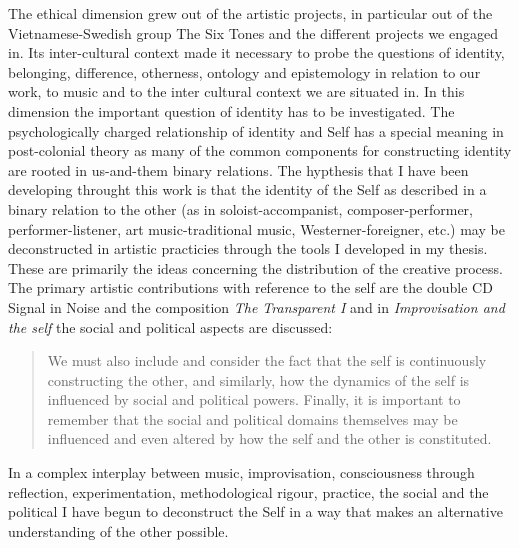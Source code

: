 \documentclass[a4paper]{article}
\begin{document}
The ethical dimension grew out of the artistic projects, in particular out of the Vietnamese-Swedish group The Six Tones and the different projects we engaged in. Its inter-cultural context made it necessary to probe the questions of identity, belonging, difference, otherness, ontology and epistemology in relation to our work, to music and to the inter cultural context we are situated in. In this dimension the important question of identity has to be investigated. The psychologically charged relationship of identity and Self has a special meaning in post-colonial theory as many of the common components for constructing identity are rooted in us-and-them binary relations. The hypthesis that I have been developing throught this work is that the identity of the Self as described in a binary relation to the other (as in soloist-accompanist, composer-performer, performer-listener, art music-traditional music, Westerner-foreigner, etc.) may be deconstructed in artistic practicies through the tools I developed in my thesis. These are primarily the ideas concerning the distribution of the creative process. The primary artistic contributions with reference to the self are the double CD Signal in Noise \cite{sixtones13} and the composition \emph{The Transparent I} \cite{frisk-transparent} and in \emph{Improvisation and the self} \cite{frisk12-improv} the social and political aspects are discussed:

\begin{quote}
  We must also include and consider the fact that the self is
  continuously constructing the other, and similarly, how the dynamics
  of the self is influenced by social and political powers. Finally,
  it is important to remember that the social and political domains
  themselves may be influenced and even altered by how the self and
  the other is constituted.
\end{quote}

In a complex interplay between music, improvisation, consciousness through reflection, experimentation, methodological rigour, practice, the social and the political I have begun to deconstruct the Self in a way that makes an alternative understanding of the other possible.
\end{document}

